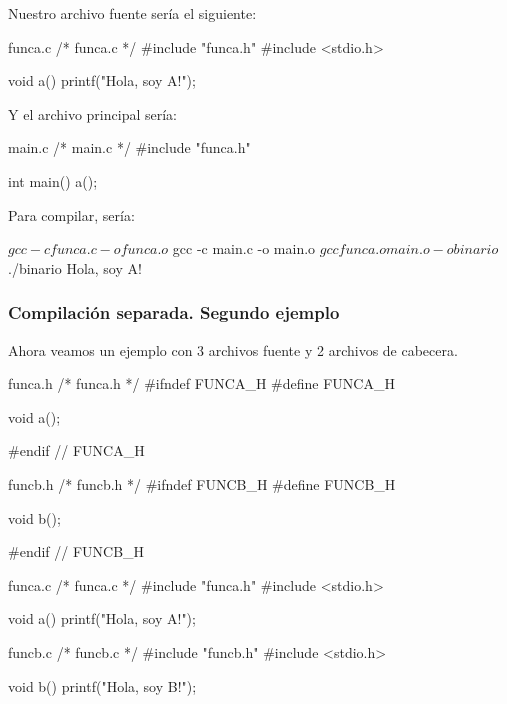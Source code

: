 \documentclass[]{scrartcl}
\begin{document}
Nuestro archivo fuente sería el siguiente:

\begin{cbox}[]{funca.c}
  /* funca.c */
  #include "funca.h"
  #include <stdio.h>

  void a(){
    printf("Hola, soy A!\n");
  }
\end{cbox}

Y el archivo principal sería:

\begin{cbox}[]{main.c}
  /* main.c */
  #include "funca.h"
  
  int main(){
    a();
  }
\end{cbox}

Para compilar, sería:

\begin{bashbox}
$ gcc -c funca.c -o funca.o
$ gcc -c main.c -o main.o
$ gcc funca.o main.o -o binario
$ ./binario
Hola, soy A!
\end{bashbox}

\subsubsection*{Compilación separada. Segundo ejemplo}

Ahora veamos un ejemplo con 3 archivos fuente y 2 archivos de cabecera.

\begin{cbox}[]{funca.h}
  /* funca.h */
  #ifndef FUNCA_H
  #define FUNCA_H
  
  void a();
  
  #endif // FUNCA_H

\end{cbox}

\begin{cbox}[]{funcb.h}
  /* funcb.h */
  #ifndef FUNCB_H
  #define FUNCB_H
  
  void b();
  
  #endif // FUNCB_H

\end{cbox}

\begin{cbox}[]{funca.c}
/* funca.c */
#include "funca.h"
#include <stdio.h>

void a(){
  printf("Hola, soy A!\n");
}
\end{cbox}

\begin{cbox}[]{funcb.c}
  /* funcb.c */
  #include "funcb.h"
  #include <stdio.h>
  
  void b(){
    printf("Hola, soy B!\n");
  }
\end{cbox}
\end{document}
